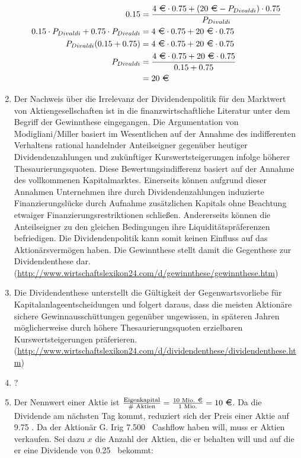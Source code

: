 \documentclass{article}
\begin{document}
\begin{enumerate}[label=(\alph*)]
\begin{align}
			0.15 &= \frac{4\text{ \EUR}\cdot 0.75 + (20\text{ \EUR} - P_{Divaldi})\cdot 0.75}{P_{Divaldi}} \notag \\
			0.15\cdot P_{Divaldi} + 0.75\cdot P_{Divaldi} &= 4\text{ \EUR}\cdot 0.75 + 20 \text{ \EUR}\cdot 0.75 \notag \\
			P_{Divaldi}(0.15 + 0.75) &= 4\text{ \EUR}\cdot 0.75 + 20 \text{ \EUR}\cdot 0.75 \notag \\
			P_{Divaldi} &= \frac{4\text{ \EUR}\cdot 0.75 + 20 \text{ \EUR}\cdot 0.75}{0.15 + 0.75} \notag \\
			&= 20 \text{ \EUR} \notag
		\end{align}
		\item Der Nachweis über die Irrelevanz der Dividendenpolitik für den Marktwert von Aktiengesellschaften ist in die finanzwirtschaftliche Literatur unter dem Begriff der Gewinnthese eingegangen. Die Argumentation von Modigliani/Miller basiert im Wesentlichen auf der Annahme des indifferenten Verhaltens rational handelnder Anteilseigner gegenüber heutiger Dividendenzahlungen und zukünftiger Kurswertsteigerungen infolge höherer Thesaurierungsquoten. Diese Bewertungsindifferenz basiert auf der Annahme des vollkommenen Kapitalmarktes. Einerseits können aufgrund dieser Annahmen Unternehmen ihre durch Dividendenzahlungen induzierte Finanzierungslücke durch Aufnahme zusätzlichen Kapitals ohne Beachtung etwaiger Finanzierungsrestriktionen schließen. Andererseits können die Anteilseigner zu den gleichen Bedingungen ihre Liquiditätspräferenzen befriedigen. Die Dividendenpolitik kann somit keinen Einfluss auf das Aktionärsvermögen haben. Die Gewinnthese stellt damit die Gegenthese zur Dividendenthese dar. (\url{http://www.wirtschaftslexikon24.com/d/gewinnthese/gewinnthese.htm})
		\item Die Dividendenthese unterstellt die Gültigkeit der Gegenwartsvorliebe für Kapitalanlageentscheidungen und folgert daraus, dass die meisten Aktionäre sichere Gewinnausschüttungen gegenüber ungewissen, in späteren Jahren möglicherweise durch höhere Thesaurierungsquoten erzielbaren Kurswertsteigerungen präferieren. (\url{http://www.wirtschaftslexikon24.com/d/dividendenthese/dividendenthese.htm})
		\item ?
		\item Der Nennwert einer Aktie ist $\frac{\text{Eigenkapital}}{\# \text{ Aktien}} = \frac{10\text{ Mio. \EUR}}{1\text{ Mio.}} = 10\text{ \EUR}$. Da die Dividende am nächsten Tag kommt, reduziert sich der Preis einer Aktie auf 9.75 \EUR. Da der Aktionär G. Irig 7.500 \EUR\, Cashflow haben will, muss er Aktien verkaufen. Sei dazu $x$ die Anzahl der Aktien, die er behalten will und auf die er eine Dividende von 0.25 \EUR\, bekommt:

\end{enumerate}
\end{document}
